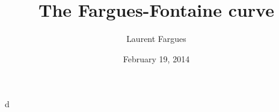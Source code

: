 \documentclass{article}
\title{The Fargues-Fontaine curve}
\author{Laurent Fargues}
\date{February 19, 2014}
\begin{document}
\maketitle





d
\end{document}
